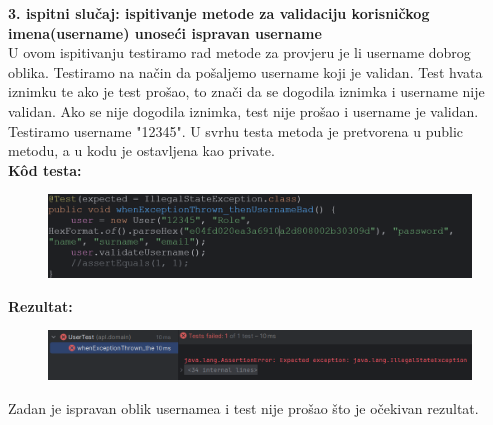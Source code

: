 \noindent \textbf{3. ispitni slučaj: ispitivanje metode za validaciju korisničkog imena(username) unoseći ispravan username}\\
U ovom ispitivanju testiramo rad metode za provjeru je li username dobrog oblika. Testiramo na način da pošaljemo username koji je validan. Test hvata iznimku te ako je test prošao, to znači da se dogodila iznimka i username nije validan. Ako se nije dogodila iznimka, test nije prošao i username je validan. Testiramo username "12345". U svrhu testa metoda je pretvorena u public metodu, a u kodu je ostavljena kao private. \\
\textbf{Kôd testa:}
\begin{figure}[H]
	\includegraphics[scale=0.5]{slike/kodTesta3.PNG} %
	\centering
\end{figure}
\noindent \textbf{Rezultat:}
\begin{figure}[H]
	\includegraphics[scale=0.6]{slike/test3.PNG} %
	\centering
\end{figure}
\noindent Zadan je ispravan oblik usernamea i test nije prošao što je očekivan rezultat. \\

